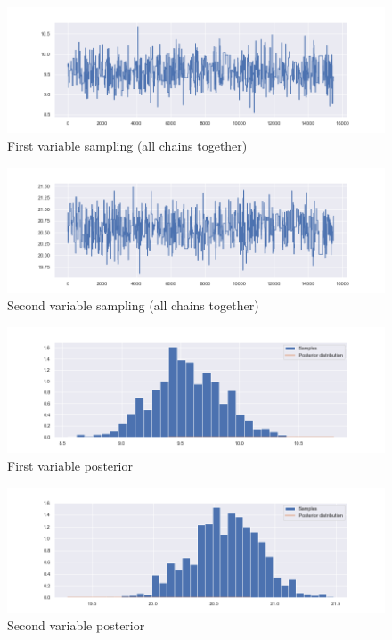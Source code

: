 \documentclass {article}
\begin{document}
\begin{figure}[h!]
	\centering
	\includegraphics[width=\textwidth]{immagini_abc_coupling_multivariate/coupling_abc_mult_sampling_1}	
	\caption{First variable sampling (all chains together)}
\end{figure}
\begin{figure}[h!]
	\centering
	\includegraphics[width=\textwidth]{immagini_abc_coupling_multivariate/coupling_abc_mult_sampling_2}	
	\caption{Second variable sampling (all chains together)}
\end{figure}

\begin{figure}[h!]
	\centering
	\includegraphics[width=\textwidth]{immagini_abc_coupling_multivariate/coupling_abc_mult_histogram_1}	
	\caption{First variable posterior}
\end{figure}
\begin{figure}[h!]
	\centering
	\includegraphics[width=\textwidth]{immagini_abc_coupling_multivariate/coupling_abc_mult_histogram_2}	
	\caption{Second variable posterior}
\end{figure}
\end{document}
